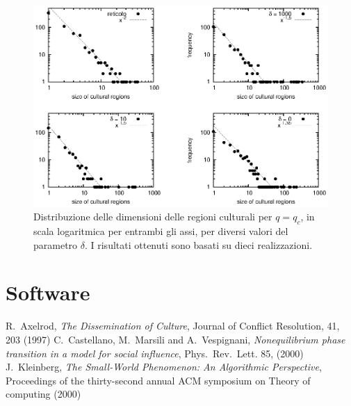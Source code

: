 \documentclass[a4paper,12pt]{article}
\begin{document}
\begin{figure}[!ht]
\begin{center}
\includegraphics[width=\textwidth]{cum_distr_size_qCritico.eps}
\end{center}
\caption{Distribuzione delle dimensioni delle regioni culturali per $q = q_c$, in scala logaritmica per entrambi gli assi, per diversi valori del parametro $\delta$. I risultati ottenuti sono basati su dieci realizzazioni.}
\label{cum_distr_size}
\end{figure}

\clearpage
\section{Software}

\newpage
\begin{thebibliography}{10}
\normalsize
  R.~Axelrod, \textit{The Dissemination of Culture}, Journal of Conflict Resolution, 41, 203 (1997)
  C.~Castellano, M.~Marsili and A.~Vespignani, \textit{Nonequilibrium phase transition in a model for social influence}, Phys.~Rev.~Lett. 85, (2000)
  J.~Kleinberg, \textit{The Small-World Phenomenon: An Algorithmic Perspective}, Proceedings of the thirty-second annual ACM symposium on Theory of computing (2000)
\end{thebibliography}
\end{document}
